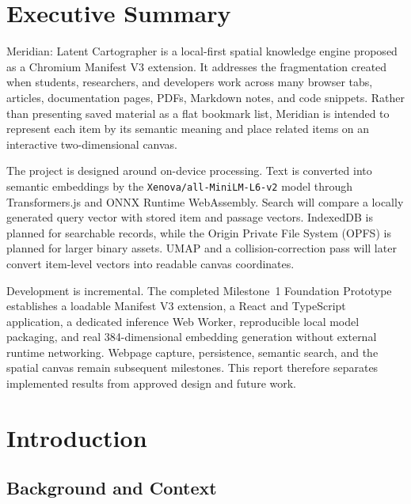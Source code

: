 \documentclass{tietreport}
\author{%
  \texttt{1024160014} Rahul Dadwal \\
  \texttt{1024160133} Jyotsna Sachdeva \\
  \texttt{1024160130} Bisman Singh Rai%
}
\begin{document}
\maketitle
\tableofcontents

\chapter*{Executive Summary}

Meridian: Latent Cartographer is a local-first spatial knowledge engine proposed as a
Chromium Manifest V3 extension. It addresses the fragmentation created when students,
researchers, and developers work across many browser tabs, articles, documentation pages,
PDFs, Markdown notes, and code snippets. Rather than presenting saved material as a flat
bookmark list, Meridian is intended to represent each item by its semantic meaning and
place related items on an interactive two-dimensional canvas.

The project is designed around on-device processing. Text is converted into semantic
embeddings by the \texttt{Xenova/all-MiniLM-L6-v2} model through Transformers.js and ONNX
Runtime WebAssembly. Search will compare a locally generated query vector with stored item
and passage vectors. IndexedDB is planned for searchable records, while the Origin Private
File System (OPFS) is planned for larger binary assets. UMAP and a collision-correction pass
will later convert item-level vectors into readable canvas coordinates.

Development is incremental. The completed Milestone~1 Foundation Prototype establishes a
loadable Manifest V3 extension, a React and TypeScript application, a dedicated inference
Web Worker, reproducible local model packaging, and real 384-dimensional embedding
generation without external runtime networking. Webpage capture, persistence, semantic
search, and the spatial canvas remain subsequent milestones. This report therefore separates
implemented results from approved design and future work.


\chapter{Introduction}

\section{Background and Context}
\end{document}
